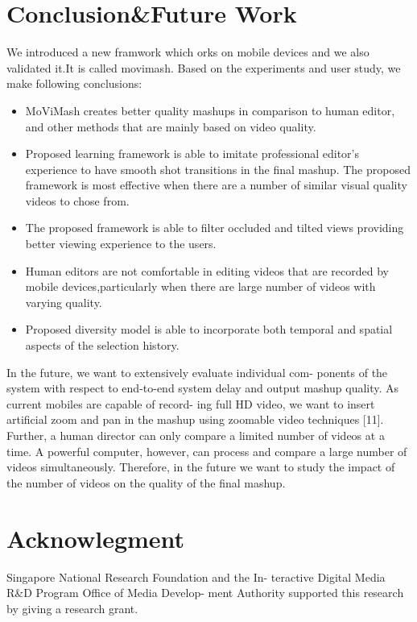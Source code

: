 \documentclass{sig-alternate}
\begin{document}
\section{Conclusion\&Future Work}
We introduced a new framwork which orks on mobile devices and we also validated it.It is called movimash. Based on the experiments and user study, we make
following conclusions:
\begin{itemize}
\item MoViMash creates better quality mashups in comparison to human editor, and other methods that are mainly based on video quality.
 \item Proposed learning framework is able to imitate professional editor’s experience to have smooth shot transitions in the ﬁnal mashup. The proposed framework is most effective when there are a number of similar visual quality videos to chose from. 
\item The proposed framework is able to ﬁlter occluded and tilted views providing better viewing experience to the users. 
\item Human editors are not comfortable in editing videos that are recorded by mobile devices,particularly when there are large number of videos with varying quality. 
\item Proposed diversity model is able to incorporate both temporal and spatial aspects of the selection history.
\end{itemize}
In the future, we want to extensively evaluate individual com-
ponents of the system with respect to end-to-end system delay and
output mashup quality. As current mobiles are capable of record-
ing full HD video, we want to insert artificial zoom and pan in the
mashup using zoomable video techniques [11]. Further, a human
director can only compare a limited number of videos at a time.
A powerful computer, however, can process and compare a large
number of videos simultaneously. Therefore, in the future we want
to study the impact of the number of videos on the quality of the
final mashup.
\section*{Acknowlegment}
Singapore National Research Foundation and the In-
teractive Digital Media R&D Program Office of Media Develop-
ment Authority  supported this research by giving a research grant.


\end{document}
